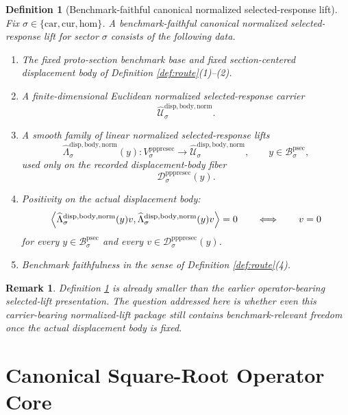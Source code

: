 \documentclass[11pt]{article}
\newcommand{\Car}{\mathrm{car}}
\newcommand{\Cur}{\mathrm{cur}}
\newcommand{\Hom}{\mathrm{hom}}
\newcommand{\ProtoSectionBody}[1]{\mathcal B_{#1}^{\mathrm{psec}}}
\newcommand{\PrePreProtoSectionVertical}[1]{V_{#1}^{\mathrm{pppresec}}}
\newcommand{\PrePreProtoSectionResidualBody}[1]{\mathcal D_{#1}^{\mathrm{pppresec}}}
\newcommand{\NormalizedLiftCarrier}[1]{\widehat{\mathcal U}_{#1}^{\mathrm{disp,body,norm}}}
\newcommand{\NormalizedSelectedResponseLift}[1]{\widehat{\Lambda}_{#1}^{\mathrm{disp,body,norm}}}
\newtheorem{definition}{Definition}
\newtheorem{remark}{Remark}
\begin{document}
\begin{definition}[Benchmark-faithful canonical normalized selected-response lift]
\label{def:normalized}
Fix \(\sigma\in\{\Car,\Cur,\Hom\}\). A \emph{benchmark-faithful canonical normalized selected-response lift} for sector \(\sigma\) consists of the following data.
\begin{enumerate}
    \item The fixed proto-section benchmark base and fixed section-centered displacement body of Definition \ref{def:route}(1)--(2).
    \item A finite-dimensional Euclidean normalized selected-response carrier
    \[
    \NormalizedLiftCarrier{\sigma}.
    \]
    \item A smooth family of linear normalized selected-response lifts
    \[
    \NormalizedSelectedResponseLift{\sigma}(y):
    \PrePreProtoSectionVertical{\sigma}\to\NormalizedLiftCarrier{\sigma},
    \qquad
    y\in\ProtoSectionBody{\sigma},
    \]
    used only on the recorded displacement-body fiber
    \[
    \PrePreProtoSectionResidualBody{\sigma}(y).
    \]
    \item Positivity on the actual displacement body:
    \[
    \ev{
    \NormalizedSelectedResponseLift{\sigma}(y)v,
    \NormalizedSelectedResponseLift{\sigma}(y)v
    }
    =0
    \qquad\Longleftrightarrow\qquad
    v=0
    \]
    for every \(y\in\ProtoSectionBody{\sigma}\) and every \(v\in\PrePreProtoSectionResidualBody{\sigma}(y)\).
    \item Benchmark faithfulness in the sense of Definition \ref{def:route}(4).
\end{enumerate}
\end{definition}

\begin{remark}
Definition \ref{def:normalized} is already smaller than the earlier operator-bearing selected-lift presentation. The question addressed here is whether even this carrier-bearing normalized-lift package still contains benchmark-relevant freedom once the actual displacement body is fixed.
\end{remark}

\section{Canonical Square-Root Operator Core}
\end{document}
